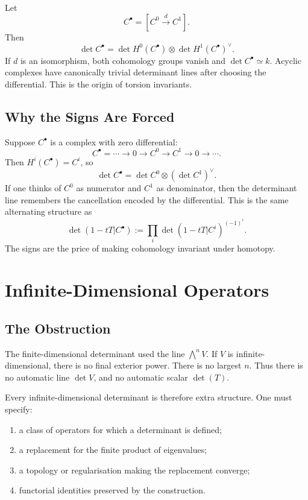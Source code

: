 \documentclass[11pt]{memoir}
\begin{document}
\begin{example}
\label{ex:two-term-complex}
Let
\[
  C^\bullet=[C^0\xrightarrow{d}C^1].
\]
Then
\[
  \det C^\bullet
  =
  \det H^0(C^\bullet)\otimes \det H^1(C^\bullet)^\vee.
\]
If \(d\) is an isomorphism, both cohomology groups vanish and
\(\det C^\bullet\simeq k\). Acyclic complexes have canonically
trivial determinant lines after choosing the differential. This is
the origin of torsion invariants.
\end{example}

\section{Why the Signs Are Forced}
\label{sec:signs-forced}

Suppose \(C^\bullet\) is a complex with zero differential:
\[
  C^\bullet=\cdots\to 0\to C^0\to C^1\to 0\to\cdots.
\]
Then \(H^i(C^\bullet)=C^i\), so
\[
  \det C^\bullet=\det C^0\otimes(\det C^1)^\vee.
\]
If one thinks of \(C^0\) as numerator and \(C^1\) as denominator, then
the determinant line remembers the cancellation encoded by the
differential. This is the same alternating structure as
\[
  \det(1-tT|C^\bullet)
  :=
  \prod_i\det(1-tT|C^i)^{(-1)^i}.
\]
The signs are the price of making cohomology invariant under
homotopy.

\chapter{Infinite-Dimensional Operators}
\label{ch:infinite}

\section{The Obstruction}
\label{sec:infinite-obstruction}

The finite-dimensional determinant used the line
\(\bigwedge^nV\). If \(V\) is infinite-dimensional, there is no final
exterior power. There is no largest \(n\). Thus there is no automatic
line \(\det V\), and no automatic scalar \(\det(T)\).

Every infinite-dimensional determinant is therefore extra structure.
One must specify:
\begin{enumerate}
\item a class of operators for which a determinant is defined;
\item a replacement for the finite product of eigenvalues;
\item a topology or regularisation making the replacement converge;
\item functorial identities preserved by the construction.
\end{enumerate}
\end{document}
